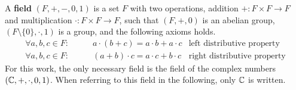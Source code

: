 A \textbf{field} $(F, +, -, 0, 1)$ is a set $F$ with two operations, addition $+: F \times F \to F$ and multiplication $\cdot: F \times F \to F$, such that $(F, +, 0)$ is an abelian group, $(F \setminus \{0\}, \cdot, 1)$ is a group, and the following axioms holds.
\begin{align}
    \forall a, b, c \in F: \qquad & a \cdot (b + c) = a \cdot b + a \cdot c & \text{left distributive property} \\
    \forall a, b, c \in F: \qquad & (a + b) \cdot c = a \cdot c + b \cdot c & \text{right distributive property}
\end{align}
For this work, the only necessary field is the field of the complex numbers $(\mathbb{C}, +, \cdot, 0, 1)$.
When referring to this field in the following, only $\mathbb{C}$ is written.
